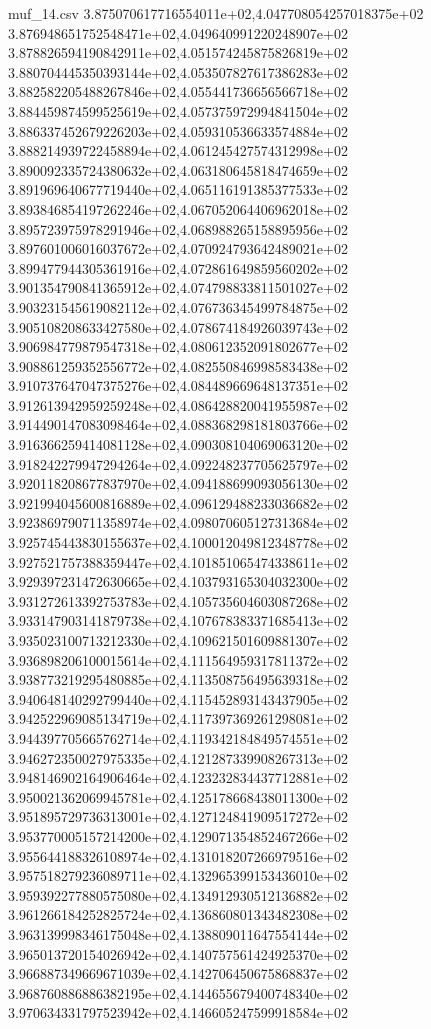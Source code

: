 \begin{filecontents*}{muf_14.csv}
3.875070617716554011e+02,4.047708054257018375e+02
3.876948651752548471e+02,4.049640991220248907e+02
3.878826594190842911e+02,4.051574245875826819e+02
3.880704445350393144e+02,4.053507827617386283e+02
3.882582205488267846e+02,4.055441736656566718e+02
3.884459874599525619e+02,4.057375972994841504e+02
3.886337452679226203e+02,4.059310536633574884e+02
3.888214939722458894e+02,4.061245427574312998e+02
3.890092335724380632e+02,4.063180645818474659e+02
3.891969640677719440e+02,4.065116191385377533e+02
3.893846854197262246e+02,4.067052064406962018e+02
3.895723975978291946e+02,4.068988265158895956e+02
3.897601006016037672e+02,4.070924793642489021e+02
3.899477944305361916e+02,4.072861649859560202e+02
3.901354790841365912e+02,4.074798833811501027e+02
3.903231545619082112e+02,4.076736345499784875e+02
3.905108208633427580e+02,4.078674184926039743e+02
3.906984779879547318e+02,4.080612352091802677e+02
3.908861259352556772e+02,4.082550846998583438e+02
3.910737647047375276e+02,4.084489669648137351e+02
3.912613942959259248e+02,4.086428820041955987e+02
3.914490147083098464e+02,4.088368298181803766e+02
3.916366259414081128e+02,4.090308104069063120e+02
3.918242279947294264e+02,4.092248237705625797e+02
3.920118208677837970e+02,4.094188699093056130e+02
3.921994045600816889e+02,4.096129488233036682e+02
3.923869790711358974e+02,4.098070605127313684e+02
3.925745443830155637e+02,4.100012049812348778e+02
3.927521757388359447e+02,4.101851065474338611e+02
3.929397231472630665e+02,4.103793165304032300e+02
3.931272613392753783e+02,4.105735604603087268e+02
3.933147903141879738e+02,4.107678383371685413e+02
3.935023100713212330e+02,4.109621501609881307e+02
3.936898206100015614e+02,4.111564959317811372e+02
3.938773219295480885e+02,4.113508756495639318e+02
3.940648140292799440e+02,4.115452893143437905e+02
3.942522969085134719e+02,4.117397369261298081e+02
3.944397705665762714e+02,4.119342184849574551e+02
3.946272350027975335e+02,4.121287339908267313e+02
3.948146902164906464e+02,4.123232834437712881e+02
3.950021362069945781e+02,4.125178668438011300e+02
3.951895729736313001e+02,4.127124841909517272e+02
3.953770005157214200e+02,4.129071354852467266e+02
3.955644188326108974e+02,4.131018207266979516e+02
3.957518279236089711e+02,4.132965399153436010e+02
3.959392277880575080e+02,4.134912930512136882e+02
3.961266184252825724e+02,4.136860801343482308e+02
3.963139998346175048e+02,4.138809011647554144e+02
3.965013720154026942e+02,4.140757561424925370e+02
3.966887349669671039e+02,4.142706450675868837e+02
3.968760886886382195e+02,4.144655679400748340e+02
3.970634331797523942e+02,4.146605247599918584e+02

\end{filecontents*}
